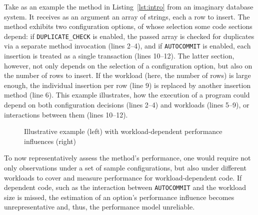 Take as an example the method in Listing~\ref{lst:intro} from an imaginary database system. It receives as an argument an array of strings, each a row to insert. The method exhibits two configuration options, of whose selection some code sections depend: if \texttt{DUPLICATE\_CHECK} is enabled, the passed array is checked for duplicates via a separate method invocation (lines 2--4), and if \texttt{AUTOCOMMIT} is enabled, each insertion is treated as a single transaction (lines 10--12). The latter section, however, not only depends on the selection of a configuration option, but also on the number of rows to insert. If the workload (here, the number of rows) is large enough, the individual insertion per row (line 9) is replaced by another insertion method (line 6). This example illustrates, how the execution of a program could depend on both configuration decisions (lines 2--4) and workloads (lines 5--9), or interactions between them (lines 10--12).

\begin{figure}
\begin{subfigure}[l]{0.63\linewidth}
	


\end{subfigure}
	\begin{subfigure}[l]{0.35\linewidth}
	\end{subfigure}
	\caption{Illustrative example (left) with workload-dependent performance influences (right)}
	\label{fig:intro}
\end{figure}


To now representatively assess the method's performance, one would require not only observations under a set of sample configurations, but also under different workloads to cover and measure performance for workload-dependent code. If dependent code, such as the interaction between \texttt{AUTOCOMMIT} and the workload size is missed, the estimation of an option's performance influence becomes unrepresentative and, thus, the performance model unreliable.

